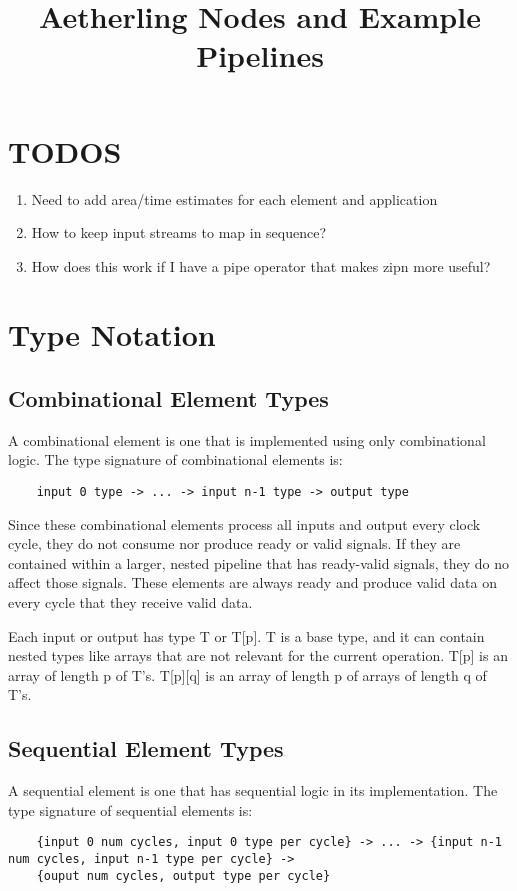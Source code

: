 \documentclass[11pt,fleqn]{article}
\numberwithin{equation}{subsection}
\begin{document}
\title{Aetherling Nodes and Example Pipelines}

\section{TODOS}
\begin{enumerate}
    \item Need to add area/time estimates for each element and application
    \item How to keep input streams to map in sequence?
    \item How does this work if I have a pipe operator that makes zipn more useful?
\end{enumerate}

\section{Type Notation}

\subsection{Combinational Element Types}
A combinational element is one that is implemented using only combinational logic.
The type signature of combinational elements is:
\begin{lstlisting}
    input 0 type -> ... -> input n-1 type -> output type
\end{lstlisting}
Since these combinational elements process all inputs and output every 
clock cycle, they do not consume nor produce ready or valid signals. If they
are contained within a larger, nested pipeline that has ready-valid signals,
they do no affect those signals. These elements are always ready and produce 
valid data on every cycle that they receive valid data.

Each input or output has type T or T[p]. T is a base type, and it can contain 
nested types like arrays that are not relevant for the current operation. T[p] 
is an array of length p of T's. T[p][q] is an array of length p of arrays of 
length q of T's.

\subsection{Sequential Element Types}
A sequential element is one that has sequential logic in its implementation.
The type signature of sequential elements is:
\begin{lstlisting}
    {input 0 num cycles, input 0 type per cycle} -> ... -> {input n-1 num cycles, input n-1 type per cycle} ->
    {ouput num cycles, output type per cycle}
\end{lstlisting}
\end{document}
